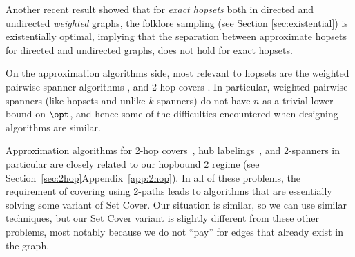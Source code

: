 Another recent result \cite{BH23folklore} showed that for \textit{exact hopsets} both in directed and undirected \textit{weighted} graphs, the folklore sampling (see Section \ref{sec:existential}) is existentially optimal, implying that the separation between approximate hopsets for directed and undirected graphs, does not hold for exact hopsets.


On the approximation algorithms side, most relevant to hopsets are the weighted pairwise spanner algorithms \cite{GKL23}, and 2-hop covers \cite{CHHZ2003}. In particular, weighted pairwise spanners (like hopsets and unlike $k$-spanners) do not have $n$ as a trivial lower bound on $\opt$, and hence some of the difficulties encountered when designing algorithms are similar. 


Approximation algorithms for 2-hop covers~\cite{CHHZ2003}, hub labelings~\cite{CHHZ2003,BGGN17}, and 2-spanners \cite{KP94,DK11} in particular are closely related to our hopbound $2$ regime (see \iflong Section~\ref{sec:2hop}\else Appendix~\ref{app:2hop}\fi).  In all of these problems, the requirement of covering using 2-paths leads to algorithms that are essentially solving some variant of Set Cover.  Our situation is similar, so we can use similar techniques, but our Set Cover variant is slightly different from these other problems, most notably because we do not ``pay'' for edges that already exist in the graph. 



